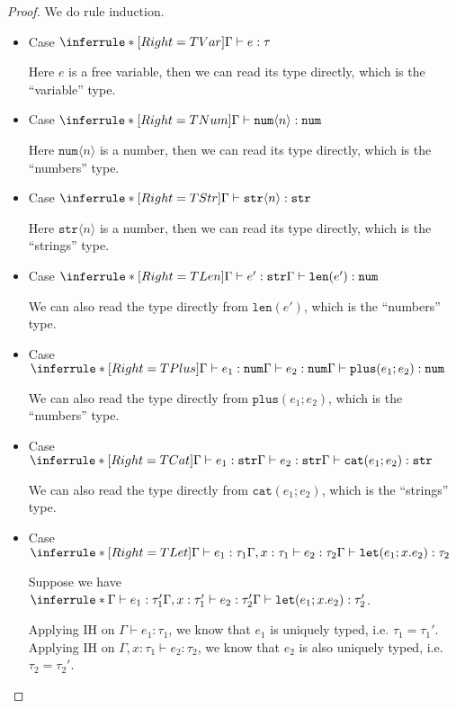\documentclass{article}
\theoremstyle{definition}
\newcommand{\ip}[1]{\langle #1 \rangle}
\begin{document}
\begin{proof}
    We do rule induction.
    \begin{itemize}
        \item Case $\inferrule*[Right=TVar]{ }{\Gamma \vdash e : \tau}$

              Here $e$ is a free variable, then we can read its type directly, which is the ``variable'' type.
        \item Case $\inferrule*[Right=TNum]{ }{\Gamma \vdash \mathtt{num}\ip{n} : \mathtt{num}}$

              Here $\mathtt{num}\ip{n}$ is a number, then we can read its type directly, which is the ``numbers'' type.
        \item Case $\inferrule*[Right=TStr]{ }{\Gamma \vdash \mathtt{str}\ip{n} : \mathtt{str}}$

              Here $\mathtt{str}\ip{n}$ is a number, then we can read its type directly, which is the ``strings'' type.
        \item Case $\inferrule*[Right=TLen]{\Gamma \vdash e':\mathtt{str}}{\Gamma \vdash \mathtt{len}(e') : \mathtt{num}}$

              We can also read the type directly from $\mathtt{len}(e')$, which is the ``numbers'' type.
        \item Case $\inferrule*[Right=TPlus]{\Gamma \vdash e_1:\mathtt{num}\\ \Gamma \vdash e_2:\mathtt{num}}{\Gamma \vdash \mathtt{plus}(e_1;e_2) : \mathtt{num}}$

              We can also read the type directly from $\mathtt{plus}(e_1;e_2)$, which is the ``numbers'' type.
        \item Case $\inferrule*[Right=TCat]{\Gamma \vdash e_1:\mathtt{str}\\ \Gamma \vdash e_2:\mathtt{str}}{\Gamma \vdash \mathtt{cat}(e_1;e_2) : \mathtt{str}}$

              We can also read the type directly from $\mathtt{cat}(e_1;e_2)$, which is the ``strings'' type.
        \item Case $\inferrule*[Right=TLet]{\Gamma \vdash e_1:\tau_1 \\ \Gamma,x:\tau_1 \vdash e_2:\tau_2}{\Gamma \vdash \mathtt{let}(e_1;x.e_2) : \tau_2}$

              Suppose we have $\inferrule*{\Gamma \vdash e_1:\tau_1' \\ \Gamma,x:\tau_1' \vdash e_2:\tau_2'}{\Gamma \vdash \mathtt{let}(e_1;x.e_2) : \tau_2'}$.

              Applying IH on $\Gamma \vdash e_1:\tau_1$, we know that $e_1$ is uniquely typed, i.e. $\tau_1 = \tau_1'$.
              Applying IH on $\Gamma,x:\tau_1 \vdash e_2:\tau_2$, we know that $e_2$ is also uniquely typed, i.e. $\tau_2 = \tau_2'$.
    \end{itemize}
\end{proof}
\end{document}

